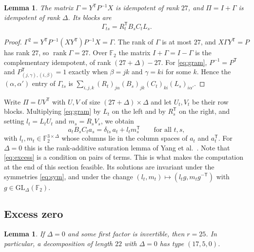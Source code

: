 \documentclass[11pt]{amsart}
\newtheorem{lemma}[theorem]{Lemma}
\theoremstyle{definition}
\theoremstyle{remark}
\numberwithin{equation}{section}
\newcommand{\F}{\mathbb{F}_2}
\newcommand{\rk}{\operatorname{rank}}
\begin{document}
\begin{lemma}\label{lem:gram}
The matrix $\Gamma=Y^{\mathsf T}P^{-1}X$ is idempotent of rank $27$, and $\Pi=I+\Gamma$ is idempotent of rank $\Delta$. Its blocks are
\begin{equation}\label{eq:gram}
\Gamma_{ts}=R_t^{\mathsf T}B_sC_tL_s .
\end{equation}
\end{lemma}

\begin{proof}
$\Gamma^2=Y^{\mathsf T}P^{-1}(XY^{\mathsf T})P^{-1}X=\Gamma$. The rank of $\Gamma$ is at most $27$, and $X\Gamma Y^{\mathsf T}=P$ has rank $27$, so $\rk\Gamma=27$. Over $\F$ the matrix $I+\Gamma=I-\Gamma$ is the complementary idempotent, of rank $(27+\Delta)-27$. For \eqref{eq:gram}, $P^{-1}=P^{\mathsf T}$ and $P^{\mathsf T}_{(j,\gamma),(i,\beta)}=1$ exactly when $\beta=jk$ and $\gamma=ki$ for some $k$. Hence the $(\alpha,\alpha')$ entry of $\Gamma_{ts}$ is $\sum_{i,j,k}(R_t)_{j\alpha}(B_s)_{jk}(C_t)_{ki}(L_s)_{i\alpha'}$.
\end{proof}

Write $\Pi=UV^{\mathsf T}$ with $U,V$ of size $(27+\Delta)\times\Delta$ and let $U_t,V_t$ be their row blocks. Multiplying \eqref{eq:gram} by $L_t$ on the left and by $R_s^{\mathsf T}$ on the right, and setting $l_t=L_tU_t$ and $m_s=R_sV_s$, we obtain
\begin{equation}\label{eq:excess}
a_tB_sC_ta_s=\delta_{ts}\,a_t+l_tm_s^{\mathsf T}\qquad\text{for all }t,s,
\end{equation}
with $l_t,m_t\in\F^{3\times\Delta}$ whose columns lie in the column spaces of $a_t$ and $a_t^{\mathsf T}$. For $\Delta=0$ this is the rank-additive saturation lemma of Yang et al.\ \cite[Lemma~5.1]{Yan26}. Note that \eqref{eq:excess} is a condition on pairs of terms. This is what makes the computation at the end of this section feasible. Its solutions are invariant under the symmetries \eqref{eq:sym}, and under the change $(l_t,m_t)\mapsto(l_tg,m_tg^{-\mathsf T})$ with $g\in\mathrm{GL}_\Delta(\F)$.

\subsection{Excess zero}

\begin{lemma}\label{lem:S}
If $\Delta=0$ and some first factor is invertible, then $r=25$. In particular, a decomposition of length $22$ with $\Delta=0$ has type $(17,5,0)$.
\end{lemma}
\end{document}
